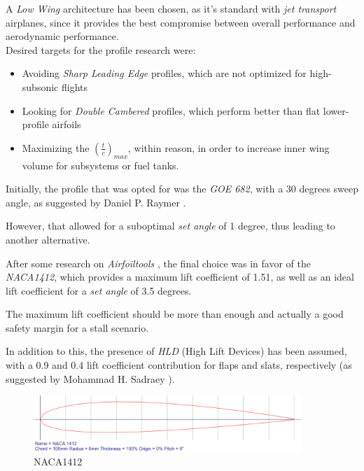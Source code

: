 \documentclass{article}
\begin{document}
A \textit{Low Wing} architecture has been chosen, as it's standard with \textit{jet transport} airplanes,
since it provides the best compromise between overall performance and aerodynamic performance.\\ 

Desired targets for the profile research were: 

\begin{itemize}
    \item Avoiding \textit{Sharp Leading Edge} profiles, which are not optimized for high-subsonic flights
    \item Looking for \textit{Double Cambered} profiles, which perform better than flat lower-profile airfoils
    \item Maximizing the $\left(\frac{t}{c}\right)_{max}$, within reason, in order to increase inner wing volume for subsystems or fuel tanks.
\end{itemize}

Initially, the profile that was opted for was the \textit{GOE 682}, with a 30 degrees sweep angle, 
as suggested by Daniel P. Raymer \autocite{Raymer_Daniel}.

However, that allowed for a suboptimal \textit{set angle} of 1 degree, thus leading to another alternative.

After some research on \textit{Airfoiltools} \autocite{Airfoiltools}, the final choice was in favor
of the \textit{NACA1412}, which provides a maximum lift coefficient of 1.51, as well as an ideal lift coefficient
for a \textit{set angle} of 3.5 degrees.

The maximum lift coefficient should be more than enough and actually a good safety margin 
for a stall scenario.

In addition to this, the presence of \textit{HLD} (High Lift Devices) has been assumed, with 
a 0.9 and 0.4 lift coefficient contribution for flaps and slats, respectively (as suggested by Mohammad H. Sadraey \autocite{Sadraey_Mohammad}).\\ 

\begin{figure}[h!]
    \centering
    \includegraphics[width=0.9\textwidth]{Sources/Plots_and_Pictures/NACA1412.png}
    \caption{NACA1412}
    \label{NACA1412}
\end{figure}
\clearpage
\end{document}
